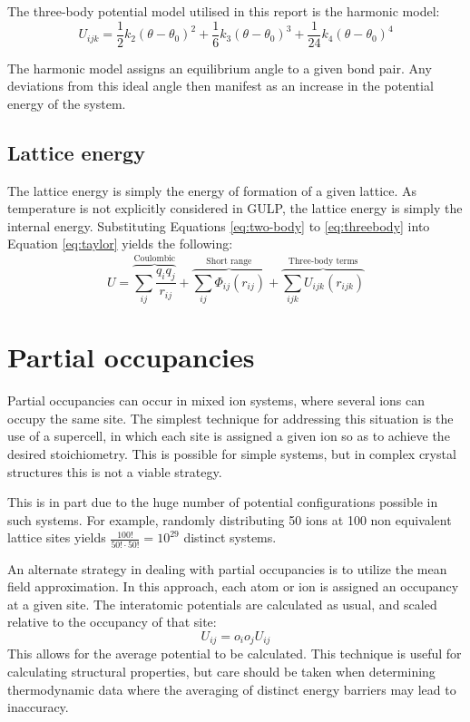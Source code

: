 The three-body potential model utilised in this report is the harmonic model:
\begin{equation}
  U_{ijk} = \frac{1}{2}k_2(\theta-\theta_0)^2   + \frac{1}{6}k_3(\theta-\theta_0)^3    + \frac{1}{24}k_4(\theta-\theta_0)^4
  \label{eq:threebody}
\end{equation}

The harmonic model assigns an equilibrium angle to a given bond pair.
Any deviations from this ideal angle then manifest as an increase in the potential energy of the system.

\subsection{Lattice energy}
The lattice energy is simply the energy of formation of a given lattice.
As temperature is not explicitly considered in GULP, the lattice energy is simply the internal energy.
Substituting Equations \ref{eq:two-body} to \ref{eq:threebody} into Equation \ref{eq:taylor} yields the following:
\begin{equation}
U = \overbrace{\sum_{ij} \frac{q_iq_j}{r_{ij}}}^\text{Coulombic} + \overbrace{\sum_{ij} \Phi_{ij}(r_{ij})}^\text{Short range} + \overbrace{\sum_{ijk} U_{ijk}(r_{ijk})}^\text{Three-body terms}
\end{equation}

\section{Partial occupancies}
Partial occupancies can occur in mixed ion systems, where several ions can occupy the same site.
The simplest technique for addressing this situation is the use of a supercell, in which each site is assigned a given ion so as to achieve the desired stoichiometry.
This is possible for simple systems, but in complex crystal structures this is not a viable strategy.

This is in part due to the huge number of potential configurations possible in such systems.
For example, randomly distributing 50 ions at 100 non equivalent lattice sites yields $\frac{100!}{50!\cdot50!} = 10^{29}$ distinct systems.

An alternate strategy in dealing with partial occupancies is to utilize the mean field approximation.
In this approach, each atom or ion is assigned an occupancy at a given site.
The interatomic potentials are calculated as usual, and scaled relative to the occupancy of that site:
$$
U_{ij} = o_io_jU_{ij}
$$
This allows for the average potential to be calculated.
This technique is useful for calculating structural properties, but care should be taken when determining thermodynamic data where the averaging of distinct energy barriers may lead to inaccuracy.

